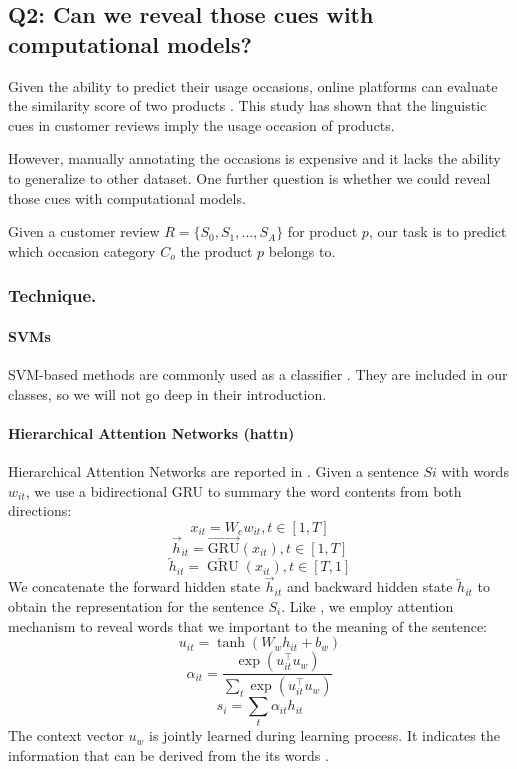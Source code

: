 \documentclass[sigconf]{acmart}
\begin{document}
\subsection{Q2: Can we reveal those cues with computational models?\label{section:q2}} Given the ability to predict their usage occasions, online platforms can evaluate the similarity score of two products \cite{colab_filtering}. This study has shown that the linguistic cues in customer reviews imply the usage occasion of products. 

However, manually annotating the occasions is expensive and it lacks the ability to generalize to other dataset. One further question is whether we could reveal those cues with computational models. 

Given a customer review $R = \{S_0, S_1,..., S_A\}$ for product $p$, our task is to predict which occasion category $C_o$ the product $p$ belongs to.
\subsubsection{Technique.}
\paragraph{SVMs}
SVM-based methods are commonly used as a classifier \cite{10.1109/5254.708428}. They are included in our classes, so we will not go deep in their introduction.
\paragraph{Hierarchical Attention Networks (hattn)}
Hierarchical Attention Networks are reported in \cite{yang-etal-2016-hierarchical}. Given a sentence $Si$ with words $w_{it}$, we use a bidirectional GRU \cite{gru} to summary the word contents from both directions:
$$x_{i t}=W_{e} w_{i t}, t \in[1, T]$$
$$\overrightarrow{h}_{i t}=\overrightarrow{\mathrm{GRU}}\left(x_{i t}\right), t \in[1, T]$$ 
$$\overleftarrow{h}_{i t}=\overleftarrow{\operatorname{GRU}}\left(x_{i t}\right), t \in[T, 1]$$
We concatenate the forward hidden state $\overrightarrow{h}_{i t}$ and backward hidden state $\overleftarrow{h}_{i t}$ to obtain the representation for the sentence $S_i$.
Like \cite{yang-etal-2016-hierarchical}, we employ attention mechanism to reveal words that we important to the meaning of the sentence: 
$$u_{i t}=\tanh \left(W_{w} h_{i t}+b_{w}\right)$$
$$\alpha_{i t}=\frac{\exp \left(u_{i t}^{\top} u_{w}\right)}{\sum_{t} \exp \left(u_{i t}^{\top} u_{w}\right)}$$
$$s_{i}=\sum_{t} \alpha_{i t} h_{i t}$$
The context vector $u_w$ is jointly learned during learning process. It indicates the information that can be derived from the its words \cite{NIPS2015_5846}.
\end{document}
